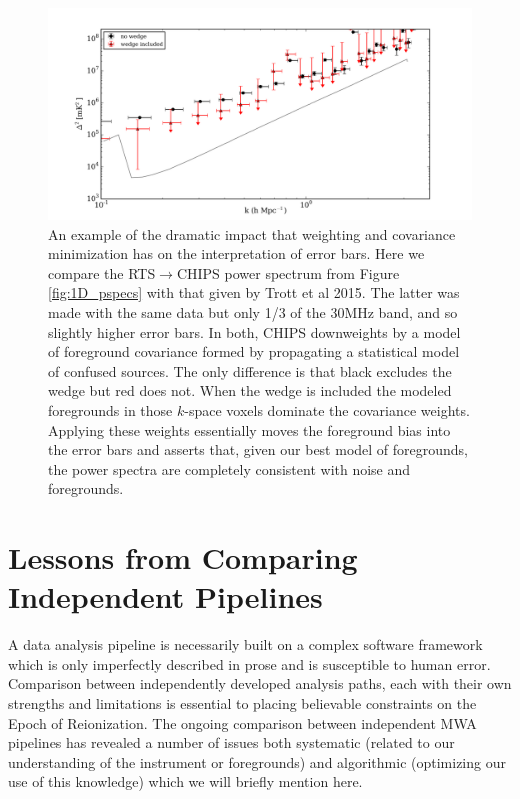 \documentclass[twolcolumn,iop]{emulateapj}
\def\chipscite{Trott et al 2015}
\begin{document}
\begin{figure}[htbp]
\begin{center}
\includegraphics[width=\textwidth]{figures/MWA_PS_Compare/MWAPipeline_compare_1d_radial_chips_pub.png}
\caption{An example of the dramatic impact that weighting and covariance minimization has on the interpretation of error bars.  Here we compare the RTS$\to$CHIPS power spectrum from Figure \ref{fig:1D_pspecs} with that given by \chipscite{}. The latter was made with the same data but only 1/3 of the 30MHz band, and so slightly higher error bars.  In both, CHIPS downweights by a model of foreground covariance formed by propagating a statistical model of confused sources. The only difference is that black excludes the wedge but red does not. When the wedge is included the modeled foregrounds in those $k$-space voxels dominate the covariance weights. Applying these weights essentially moves the foreground bias into the error bars and asserts that, given our best model of foregrounds, the power spectra are completely consistent with noise and  foregrounds.}
\label{fig:CHIPS_compare}
\end{center}
\end{figure}

\section{Lessons from Comparing Independent Pipelines}
\label{sec:lessons}
          A data analysis pipeline is necessarily built on a complex software framework which is only imperfectly described in prose and is susceptible to human error.  Comparison between independently developed analysis paths, each with their own strengths and limitations is essential to placing believable constraints on the Epoch of Reionization. The ongoing comparison between independent MWA pipelines has revealed a number of issues both systematic (related to our understanding of the instrument or foregrounds) and algorithmic (optimizing our use of this knowledge) which we will briefly mention here.
      
\end{document}
